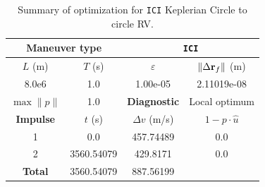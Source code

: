 \begin{table}[htpb]
    \centering
    \begin{tabular}{cccc} \toprule
    \multicolumn{2}{c}{\textbf{Maneuver type}} & \multicolumn{2}{c}{\texttt{ICI}} \\ \midrule
    \(L\) (m) & \(T\) (s) & \(\varepsilon\) & \(\lVert \Delta \mathbf{r}_{f} \rVert\) (m)    \\ \midrule
    8.0e6          & 1.0          & 1.00e-05                & 2.11019e-08                        \\ \midrule
    \(\max \lVert p \rVert\) & 1.0     & \textbf{Diagnostic}   & Local optimum        \\ \midrule
    \textbf{Impulse} & \(t\) (s) & \(\Delta v\) (m/s) & \(1 - p \cdot \hat{u}\) \\ \midrule
    1                 & 0.0          & 457.74489             & 0.0                    \\
    2                 & 3560.54079          & 429.8171             & 0.0                    \\\midrule
    \textbf{Total}   & 3560.54079          & 887.56199             &                     \\ \bottomrule   
    \end{tabular}
    \caption{Summary of optimization for \texttt{ICI} Keplerian Circle to circle RV.}
    \label{tab:tb_ctcr_ICI_tab}
\end{table}

